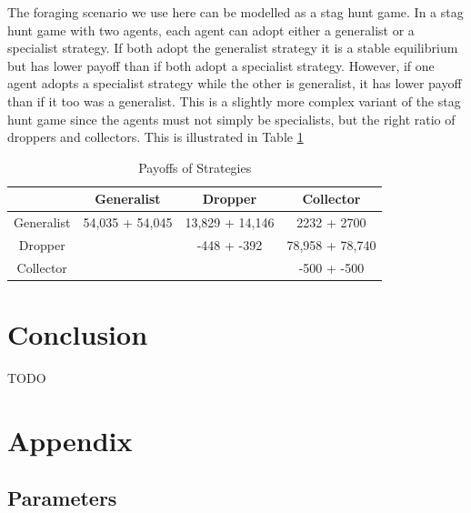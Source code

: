 \documentclass[12pt]{article}  %
\begin{document}
The foraging scenario we use here can be modelled as a stag hunt game.
In a stag hunt game with two agents, each agent can adopt either a generalist or a specialist strategy. 
If both adopt the generalist strategy it is a stable equilibrium but has lower payoff than if both adopt a specialist strategy.
However, if one agent adopts a specialist strategy while the other is generalist, it has lower payoff than if it too was a generalist.
This is a slightly more complex variant of the stag hunt game since the agents must not simply be specialists, but the right ratio of droppers and collectors. This is illustrated in Table \ref{tab:payoffs}\\

\begin{table}
\begin{center}
\begin{tabular}{ |c|c|c|c| } 
 \hline
  & Generalist & Dropper & Collector  \\ 
 \hline
 \hline
 Generalist & 54,035 + 54,045  & 13,829 + 14,146 & 2232 + 2700 \\ 
 \hline
 Dropper &  & -448 + -392 & 78,958 + 78,740 \\ 
 \hline
 Collector &  &  & -500 + -500 \\ 
 \hline
 \end{tabular}
\caption{\label{tab:payoffs}Payoffs of Strategies}
\end{center}
\end{table}


\section{Conclusion}

TODO




\section{Appendix}

\subsection{Parameters}
\end{document}
